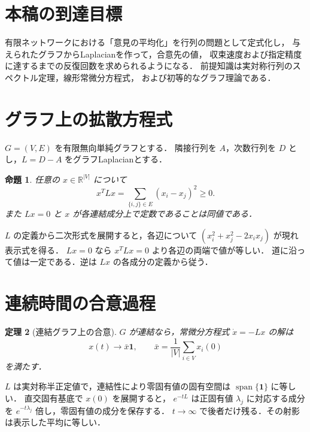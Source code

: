 \documentclass[a5paper,10pt,onecolumn]{jsarticle}
\makeatletter
\theoremstyle{mathnotetheorem}
\newtheorem{theorem}{定理}[section]
\newtheorem{proposition}[theorem]{命題}
\renewcommand{\proofname}{証明}
\renewenvironment{proof}[1][\proofname]{%
  \par\pushQED{\qed}\normalfont\topsep4\p@\@plus2\p@\relax
  \trivlist\item[\hskip\labelsep\bfseries #1]\ignorespaces
}{\popQED\endtrivlist\@endpefalse}
\makeatother
\begin{document}
\section*{本稿の到達目標}
有限ネットワークにおける「意見の平均化」を行列の問題として定式化し，
与えられたグラフからLaplacianを作って，合意先の値，
収束速度および指定精度に達するまでの反復回数を求められるようになる．
前提知識は実対称行列のスペクトル定理，線形常微分方程式，
および初等的なグラフ理論である．

\section{グラフ上の拡散方程式}
$G=(V,E)$ を有限無向単純グラフとする．
隣接行列を $A$，次数行列を $D$ とし，$L=D-A$ をグラフLaplacianとする．
\begin{proposition}
任意の $x\in\mathbb R^{|V|}$ について
\[
 x^TLx=\sum_{\{i,j\}\in E}(x_i-x_j)^2\ge0.
\]
また $Lx=0$ と $x$ が各連結成分上で定数であることは同値である．
\end{proposition}
\begin{proof}
$L$ の定義から二次形式を展開すると，各辺について
$(x_i^2+x_j^2-2x_ix_j)$ が現れ表示式を得る．
$Lx=0$ なら $x^TLx=0$ より各辺の両端で値が等しい．
道に沿って値は一定である．逆は $Lx$ の各成分の定義から従う．
\end{proof}
\section{連続時間の合意過程}
\begin{theorem}[連結グラフ上の合意]
$G$ が連結なら，常微分方程式
$\dot x=-Lx$ の解は
\[
 x(t)\longrightarrow \bar x\mathbf1,
 \qquad \bar x=\frac1{|V|}\sum_{i\in V}x_i(0)
\]
を満たす．
\end{theorem}
\begin{proof}
$L$ は実対称半正定値で，連結性により零固有値の固有空間は
$\operatorname{span}\{\mathbf1\}$ に等しい．
直交固有基底で $x(0)$ を展開すると，
$e^{-tL}$ は正固有値 $\lambda_j$ に対応する成分を
$e^{-t\lambda_j}$ 倍し，零固有値の成分を保存する．
$t\to\infty$ で後者だけ残る．その射影は表示した平均に等しい．
\end{proof}
\end{document}
